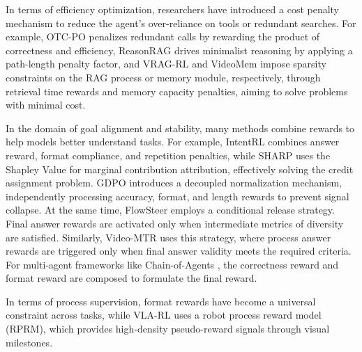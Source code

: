 In terms of efficiency optimization, researchers have introduced a cost penalty mechanism to reduce the agent's over-reliance on tools or redundant searches. For example, OTC-PO \cite{OTC-PO} penalizes redundant calls by rewarding the product of correctness and efficiency, ReasonRAG \cite{ReasonRAG} drives minimalist reasoning by applying a path-length penalty factor, and VRAG-RL \cite{VRAG-RL} and VideoMem \cite{VideoMem} impose sparsity constraints on the RAG process or memory module, respectively, through retrieval time rewards and memory capacity penalties, aiming to solve problems with minimal cost.

In the domain of goal alignment and stability, many methods combine rewards to help models better understand tasks. For example, IntentRL \cite{IntentRL} combines answer reward, format compliance, and repetition penalties, while SHARP \cite{SHARP} uses the Shapley Value for marginal contribution attribution, effectively solving the credit assignment problem. GDPO \cite{GDPO} introduces a decoupled normalization mechanism, independently processing accuracy, format, and length rewards to prevent signal collapse. At the same time, FlowSteer \cite{FlowSteer} employs a conditional release strategy. Final answer rewards are activated only when intermediate metrics of diversity are satisfied. Similarly, Video-MTR \cite{Video-MTR} uses this strategy, where process answer rewards are triggered only when final answer validity meets the required criteria. For multi-agent frameworks like Chain-of-Agents \cite{Chain-of-Agents}, the correctness reward and format reward are composed to formulate the final reward.

In terms of process supervision, format rewards have become a universal constraint across tasks, while VLA-RL \cite{VLA-RL} uses a robot process reward model (RPRM), which provides high-density pseudo-reward signals through visual milestones.

